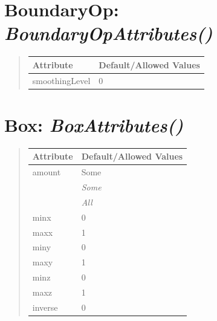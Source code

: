 \documentclass[letterpaper,10pt,english]{sphinxmanual}
\begin{document}
\section{\textbf{BoundaryOp}: \emph{BoundaryOpAttributes()}}
\label{attributes:boundaryop-boundaryopattributes}
\begin{DUlineblock}{0em}
\item[] 
\end{DUlineblock}
\begin{quote}

\begin{tabulary}{\linewidth}{|L|L|}
\hline

\textbf{Attribute}
 & 
\textbf{Default/Allowed Values}
\\
\hline
smoothingLevel
 & 
0
\\
\hline\end{tabulary}

\end{quote}

\begin{DUlineblock}{0em}
\item[] 
\end{DUlineblock}

\begin{DUlineblock}{0em}
\item[] 
\end{DUlineblock}


\section{\textbf{Box}: \emph{BoxAttributes()}}
\label{attributes:box-boxattributes}
\begin{DUlineblock}{0em}
\item[] 
\end{DUlineblock}
\begin{quote}

\begin{tabulary}{\linewidth}{|L|L|}
\hline

\textbf{Attribute}
 & 
\textbf{Default/Allowed Values}
\\
\hline
amount
 & 
Some
\\
\hline & 
\emph{Some}
\\
\hline & 
\emph{All}
\\
\hline
minx
 & 
0
\\
\hline
maxx
 & 
1
\\
\hline
miny
 & 
0
\\
\hline
maxy
 & 
1
\\
\hline
minz
 & 
0
\\
\hline
maxz
 & 
1
\\
\hline
inverse
 & 
0
\\
\hline\end{tabulary}

\end{quote}
\end{document}
